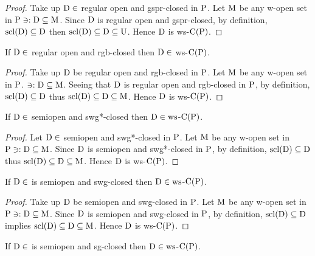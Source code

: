\begin{proof}
Take up $\mathrm{D}\in$ regular open and gspr-closed in $\mathrm{P}$. Let $\mathrm{M}$ be any w-open set in $\mathrm{P}\ni: \mathrm{D}\subseteq \mathrm{M}$. Since $\mathrm{D}$ is regular open and gspr-closed, by definition, $\mathrm{scl}(\mathrm{D})\subseteq \mathrm{D}$ then $\mathrm{scl}(\mathrm{D})\subseteq \mathrm{D}\subseteq \mathrm{U}$. Hence $\mathrm{D}$ is ws-$\mathrm{C}(\mathrm{P})$.
\end{proof}

\begin{thm}\label{thm2.1.14}
If $\mathrm{D}\in$ regular open and rgb-closed then $\mathrm{D}\in$ ws-$\mathrm{C}(\mathrm{P})$.
\end{thm}

\begin{proof}
Take up $\mathrm{D}$ be regular open and rgb-closed in $\mathrm{P}$. Let $\mathrm{M}$ be any w-open set in $\mathrm{P}$. $\ni: \mathrm{D}\subseteq \mathrm{M}$. Seeing that $\mathrm{D}$ is regular open and rgb-closed in $\mathrm{P}$, by definition, $\mathrm{scl}(\mathrm{D})\subseteq \mathrm{D}$ thus $\mathrm{scl}(\mathrm{D})\subseteq \mathrm{D}\subseteq \mathrm{M}$. Hence $\mathrm{D}$ is ws-$\mathrm{C}(\mathrm{P})$.
\end{proof}

\begin{thm}\label{thm2.1.15}
If $\mathrm{D}\in$ semiopen and swg*-closed then $\mathrm{D}\in\mathrm{ws}$-$\mathrm{C}(\mathrm{P})$.
\end{thm}

\begin{proof}
Let $\mathrm{D}\in$ semiopen and swg*-closed in $\mathrm{P}$. Let $\mathrm{M}$ be any w-open set in $\mathrm{P} \ni: \mathrm{D}\subseteq \mathrm{M}$. Since $\mathrm{D}$ is semiopen and swg*-closed in $\mathrm{P}$, by definition, $\mathrm{scl}(\mathrm{D})\subseteq \mathrm{D}$ thus $\mathrm{scl}(\mathrm{D})\subseteq \mathrm{D}\subseteq \mathrm{M}$. Hence $\mathrm{D}$ is ws-$\mathrm{C}(\mathrm{P})$.
\end{proof}

\begin{thm}\label{thm2.1.16}
If $\mathrm{D}\in$ is semiopen and swg-closed then $\mathrm{D}\in\mathrm{ws}$-$\mathrm{C}(\mathrm{P})$.
\end{thm}

\begin{proof}
Take up $\mathrm{D}$ be semiopen and swg-closed in $\mathrm{P}$. Let $\mathrm{M}$ be any w-open set in $\mathrm{P}\ni : \mathrm{D}\subseteq \mathrm{M}$. Since $\mathrm{D}$ is semiopen and swg-closed in $\mathrm{P}$, by definition, $\mathrm{scl}(\mathrm{D})\subseteq \mathrm{D}$ implies $\mathrm{scl}(\mathrm{D})\subseteq \mathrm{D}\subseteq \mathrm{M}$. Hence $\mathrm{D}$ is ws-$\mathrm{C}(\mathrm{P})$.
\end{proof}

\begin{thm}\label{2.1.17}
If $\mathrm{D}\in$ is semiopen and sg-closed then $\mathrm{D}\in\mathrm{ws}$-$\mathrm{C}(\mathrm{P})$.
\end{thm}


